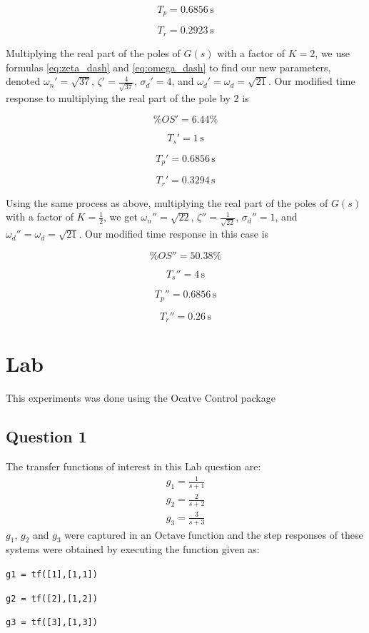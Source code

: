 \documentclass[a4paper, 12pt]{article}
\begin{document}
			\[
				T_p = 0.6856\,\text{s}
			\]

			\[
				T_r = 0.2923\,\text{s}
			\]

			Multiplying the real part of the poles of $G(s)$ with a factor of $K=2$, we use formulas \eqref{eq:zeta_dash} and \eqref{eq:omega_dash} to find our new parameters, denoted $\omega_n' = \sqrt{37}$, $\zeta' = \frac{4}{\sqrt{37}}$, $\sigma_d' = 4$, and $\omega_d' = \omega_d = \sqrt{21}$. Our modified time response to multiplying the real part of the pole by 2 is

			\[
				\%OS' = 6.44\%
			\]

			\[
				T_s' = 1\,\text{s}
			\]

			\[
				T_p' = 0.6856\,\text{s}
			\]

			\[
				T_r' = 0.3294\,\text{s}
			\]

			Using the same process as above, multiplying the real part of the poles of $G(s)$ with a factor of $K=\frac{1}{2}$, we get $\omega_n'' = \sqrt{22}$, $\zeta'' = \frac{1}{\sqrt{22}}$, $\sigma_d'' = 1$, and $\omega_d'' = \omega_d = \sqrt{21}$. Our modified time response in this case is

			\[
				\%OS'' = 50.38\%
			\]

			\[
				T_s'' = 4\,\text{s}
			\]

			\[
				T_p'' = 0.6856\,\text{s}
			\]

			\[
				T_r'' = 0.26\,\text{s}
			\]


	\section{Lab} %
	\label{sec:lab}
		This experiments was done using the Ocatve Control package
	\subsection{Question 1}
	\label{sec:question_1_lab}
		The transfer functions of interest in this Lab question are:
			\begin{equation*}
				\begin{array}{rcl}
					g_1 = \frac{1}{s+1}\\
					g_2 = \frac{2}{s+2}\\
					g_3 = \frac{3}{s+3}
				\end{array}
			\end{equation*}
		$g_1$, $g_2$ and $g_3$ were captured in an Octave function and the step responses of these systems were obtained by executing the function given as:\par
		\texttt{g1 = tf([1],[1,1])}\par
		\texttt{g2 = tf([2],[1,2])}\par
		\texttt{g3 = tf([3],[1,3])}\par
\end{document}
